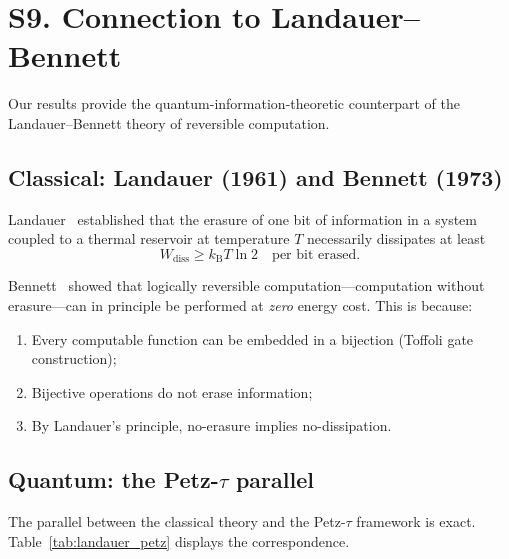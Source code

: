 \documentclass[prl,twocolumn,superscriptaddress,longbibliography]{revtex4-2}
\newcommand{\kB}{k_{\mathrm{B}}}
\newcommand{\tauasym}{\tau}
\begin{document}
\section{S9. Connection to Landauer--Bennett}
\label{sec:landauer}

Our results provide the quantum-information-theoretic counterpart
of the Landauer--Bennett theory of reversible computation.

\subsection{Classical: Landauer (1961) and Bennett (1973)}

Landauer~\cite{Landauer1961} established that the erasure of one
bit of information in a system coupled to a thermal reservoir at
temperature $T$ necessarily dissipates at least
\begin{equation}
W_{\mathrm{diss}} \geq \kB T \ln 2
\quad\text{per bit erased.}
\label{eq:landauer}
\end{equation}

Bennett~\cite{Bennett1973} showed that logically reversible
computation---computation without erasure---can in principle be
performed at \emph{zero} energy cost.  This is because:
\begin{enumerate}
\item Every computable function can be embedded in a bijection
  (Toffoli gate construction);
\item Bijective operations do not erase information;
\item By Landauer's principle, no-erasure implies no-dissipation.
\end{enumerate}

\subsection{Quantum: the Petz-$\tauasym$ parallel}

The parallel between the classical theory and the Petz-$\tauasym$
framework is exact.  Table~\ref{tab:landauer_petz} displays
the correspondence.
\end{document}
